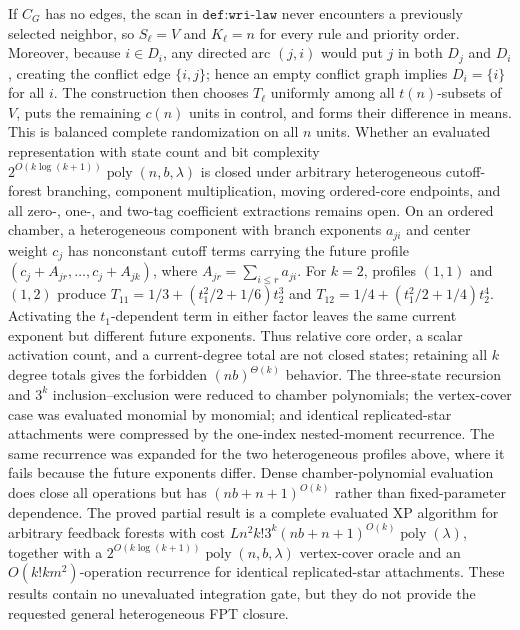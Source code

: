 If \(C_G\) has no edges, the scan in \(\texttt{def:wri-law}\) never encounters a previously selected neighbor, so \(S_\ell=V\) and \(K_\ell=n\) for every rule and priority order.  Moreover, because \(i\in D_i\), any directed arc \((j,i)\) would put \(j\) in both \(D_j\) and \(D_i\), creating the conflict edge \(\{i,j\}\); hence an empty conflict graph implies \(D_i=\{i\}\) for all \(i\).  The construction then chooses \(T_\ell\) uniformly among all \(t(n)\)-subsets of \(V\), puts the remaining \(c(n)\) units in control, and forms their difference in means.  This is balanced complete randomization on all \(n\) units.
Whether an evaluated representation with state count and bit complexity \(2^{O(k\log(k+1))}\operatorname{poly}(n,b,\lambda)\) is closed under arbitrary heterogeneous cutoff-forest branching, component multiplication, moving ordered-core endpoints, and all zero-, one-, and two-tag coefficient extractions remains open.
On an ordered chamber, a heterogeneous component with branch exponents \(a_{ji}\) and center weight \(c_j\) has nonconstant cutoff terms carrying the future profile \((c_j+A_{jr},\ldots,c_j+A_{jk})\), where \(A_{jr}=\sum_{i\le r}a_{ji}\).  For \(k=2\), profiles \((1,1)\) and \((1,2)\) produce \(T_{11}=1/3+(t_1^2/2+1/6)t_2^3\) and \(T_{12}=1/4+(t_1^2/2+1/4)t_2^4\).  Activating the \(t_1\)-dependent term in either factor leaves the same current exponent but different future exponents.  Thus relative core order, a scalar activation count, and a current-degree total are not closed states; retaining all \(k\) degree totals gives the forbidden \((nb)^{\Theta(k)}\) behavior.
The three-state recursion and \(3^k\) inclusion--exclusion were reduced to chamber polynomials; the vertex-cover case was evaluated monomial by monomial; and identical replicated-star attachments were compressed by the one-index nested-moment recurrence.  The same recurrence was expanded for the two heterogeneous profiles above, where it fails because the future exponents differ.  Dense chamber-polynomial evaluation does close all operations but has \((nb+n+1)^{O(k)}\) rather than fixed-parameter dependence.
The proved partial result is a complete evaluated XP algorithm for arbitrary feedback forests with cost \(Ln^2k!3^k(nb+n+1)^{O(k)}\operatorname{poly}(\lambda)\), together with a \(2^{O(k\log(k+1))}\operatorname{poly}(n,b,\lambda)\) vertex-cover oracle and an \(O(k!km^2)\)-operation recurrence for identical replicated-star attachments.  These results contain no unevaluated integration gate, but they do not provide the requested general heterogeneous FPT closure.
